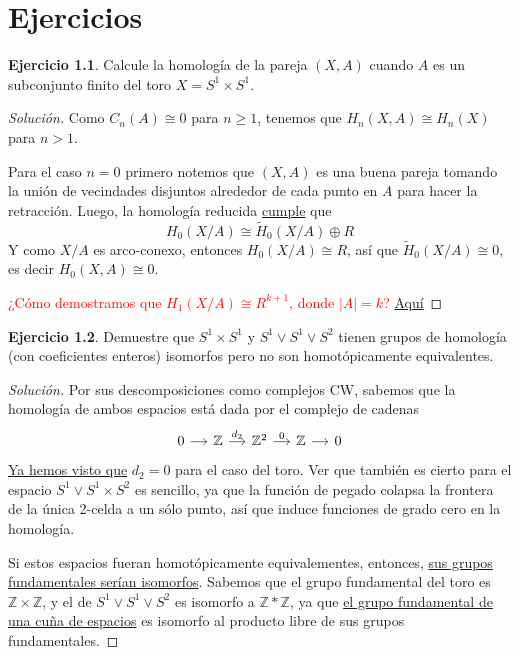 \documentclass[spanish]{book}
\theoremstyle{definition}
\newtheorem*{ejer}{Ejercicio}
\newcommand{\Z}{\mathbb{Z}}
\begin{document}
\chapter{Ejercicios}
	\begin{ejer}
	Calcule la homología de la pareja $(X,A)$ cuando $A$ es un subconjunto finito del toro $X=S^1\times S^1$.
\end{ejer}
\begin{proof}[Solución]
	Como $C_n(A)\cong0$ para $n\geq1$, tenemos que $H_n(X,A)\cong H_n(X)$ para $n>1$.
	
	Para el caso $n=0$ primero notemos que $(X,A)$ es una buena pareja tomando la unión de vecindades disjuntos alrededor de cada punto en $A$ para hacer la retracción. Luego, la homología reducida \hyperref[sec:6.4]{cumple} que
	\[H_0(X/A)\cong\tilde{H}_0(X/A)\oplus R\]
	Y como $X/A$ es arco-conexo, entonces $H_0(X/A)\cong R$, así que $\tilde{H}_0(X/A)\cong0$, es decir $H_0(X,A)\cong0$.
	
	\textcolor{red}{¿Cómo demostramos que $H_1(X/A)\cong R^{k+1}$, donde $|A|=k$?} \href{https://math.stackexchange.com/questions/129686/finding-the-homology-group-of-h-n-x-a-when-a-is-a-finite-set-of-points}{Aquí}
\end{proof}
\begin{ejer}\label{ejer:homol-homot}Demuestre que $S^1 \times S^1$ y $S^1 \vee S^1 \vee S^2$ tienen grupos de homología (con coeficientes enteros) isomorfos pero no son homotópicamente equivalentes.
\begin{proof}[Solución]
	Por sus descomposiciones como complejos CW, sabemos que la homología de ambos espacios está dada por el complejo de cadenas
	\[\begin{tikzcd}[column sep=small]
		0\arrow[r]&\Z\arrow[r,"d_2"]&\Z^2\arrow[r,"0"]&\Z\arrow[r]&0
	\end{tikzcd}\]
	\hyperref[ejem:toroCW]{Ya hemos visto que} $d_2=0$ para el caso del toro. Ver que también es cierto para el espacio $S^1\vee S^1\times S^2$ es sencillo, ya que la función de pegado colapsa la frontera de la única 2-celda a un sólo punto, así que induce funciones de grado cero en la homología.
	
	Si estos espacios fueran homotópicamente equivalementes, entonces, \hyperref[1.2.1]{sus grupos fundamentales serían isomorfos}. Sabemos que el grupo fundamental del toro es $\Z\times\Z$, y el de $S^1 \vee S^1 \vee S^2$ es isomorfo a $\Z\ast\Z$, ya que \hyperref[sec:grp-fund-cuña]{el grupo fundamental de una cuña de espacios} es isomorfo al producto libre de sus grupos fundamentales.
\end{proof}
\end{ejer}
\end{document}

